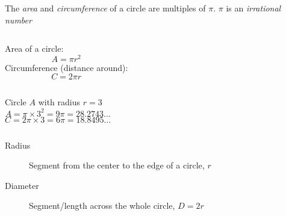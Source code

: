 \documentclass[onlytextwidth]{beamer}
\begin{document}
\begin{frame}{The \emph{area} and  \emph{circumference} of a circle are multiples of $\pi$.}
    {$\pi$ is an \emph{irrational number}}
    \begin{columns}
            Area of a circle:
            {\large $$A=\pi r^2$$}
            Circumference (distance around):
            {\large $$C=2 \pi r$$}
        \end{columns}  \vspace{0.5cm}
        \begin{columns}
            Circle $A$ with radius $r=3$
            $$A = \pi \times 3^2 = 9 \pi = 28.2743... $$
            $$C = 2\pi \times 3 = 6 \pi = 18.8495... $$
        \end{columns} \vspace{0.5cm}
        \begin{description}
            \item[Radius] Segment from the center to the edge of a circle, $r$
            \item[Diameter] Segment/length across the whole circle, $D=2r$
        \end{description}
    \end{frame}
\end{document}
